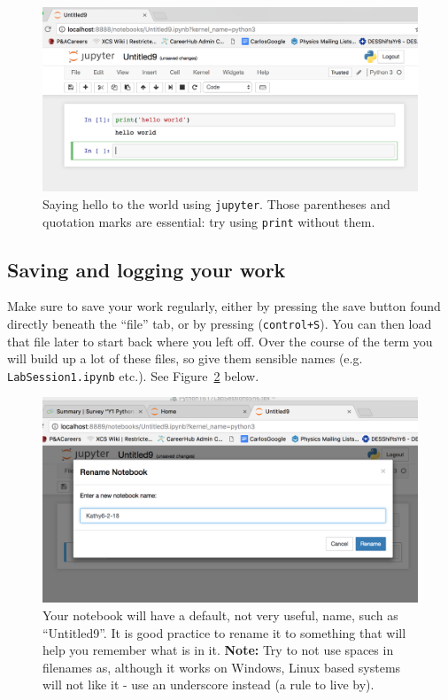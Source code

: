 \begin{figure}[H]  \centering
\includegraphics[width=14cm]{Figures/HelloW.png}
\caption{Saying hello to the world using \texttt{jupyter}. Those parentheses and quotation marks are essential: try using {\tt print} without them.}
\label{helloW}
\end{figure}


\subsection{Saving and logging your work}

Make sure to save your work regularly, either by pressing the save button found directly beneath the ``file'' tab, or by pressing  ({\tt control+S}). You can then load that file later to start back where you left off. Over the course of the term you will build up a lot of these files, so give them sensible names (e.g. {\tt LabSession1.ipynb} etc.). See Figure~\ref{newname} below.

\begin{figure}[H]  
\centering
\includegraphics[width=14cm]{Figures/newname.png}
\caption{Your notebook will have a default, not very useful, name, such as ``Untitled9''. It is good practice to rename it to something that will help you remember what is in it. \textbf{Note:} Try to not use spaces in filenames as, although it works on Windows, Linux based systems will not like it - use an underscore instead (a rule to live by).}
\label{newname}
\end{figure}



